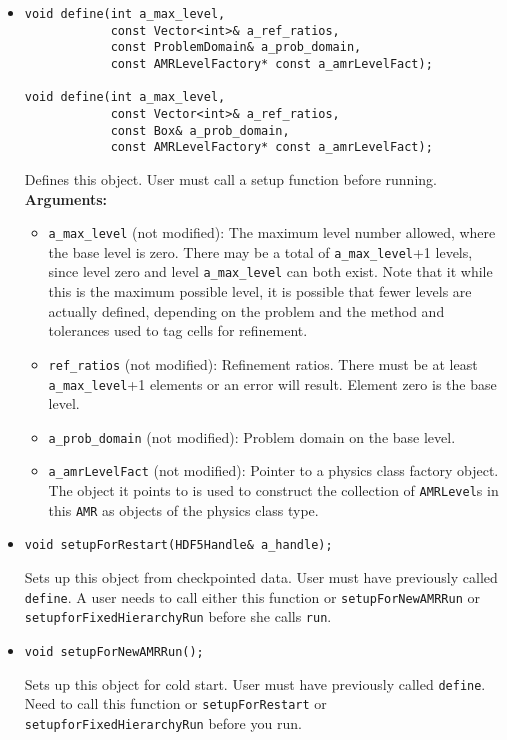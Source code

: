 \begin{itemize}

\item
\begin{verbatim}
void define(int a_max_level, 
            const Vector<int>& a_ref_ratios,
            const ProblemDomain& a_prob_domain,
            const AMRLevelFactory* const a_amrLevelFact);

void define(int a_max_level, 
            const Vector<int>& a_ref_ratios,
            const Box& a_prob_domain,
            const AMRLevelFactory* const a_amrLevelFact);
\end{verbatim}
Defines this object.  User must call a setup function before running.
\\ {\bf Arguments:}
  \begin{itemize}
  \item
  \verb/a_max_level/ (not modified):
  The maximum level number allowed, where the base level is zero.  There
  may be a total of \verb/a_max_level/+1 levels, since level zero and level
  \verb/a_max_level/ can both exist.  Note that it while this is the maximum
  possible level, it is possible that fewer levels are actually defined,
  depending on the problem and the method and tolerances used to tag cells
  for refinement.
  \item
  \verb/ref_ratios/ (not modified):
  Refinement ratios.  There must be at least \verb/a_max_level/+1 elements
  or an error will result.  Element  zero is the base level.
  \item
  \verb/a_prob_domain/ (not modified):
  Problem domain on the base level.
  \item
  \verb/a_amrLevelFact/ (not modified):
  Pointer to a physics class factory object. The object it points to is
  used to construct the collection of \verb|AMRLevel|s in this \verb|AMR| as objects of
  the physics class type.  
  \end{itemize}

\item
\begin{verbatim}
void setupForRestart(HDF5Handle& a_handle);
\end{verbatim}
Sets up this object from checkpointed data.  User must have
previously called {\tt define}. A user needs to call either this
function or 
\verb|setupForNewAMRRun| or \verb|setupforFixedHierarchyRun|
before she calls \verb|run|.

\item
\begin{verbatim}
void setupForNewAMRRun();
\end{verbatim}
Sets up this object for cold start.  User must have previously called
{\tt define}.  Need to call this function or \verb|setupForRestart| or
\verb|setupforFixedHierarchyRun| before you run.


\end{itemize}
